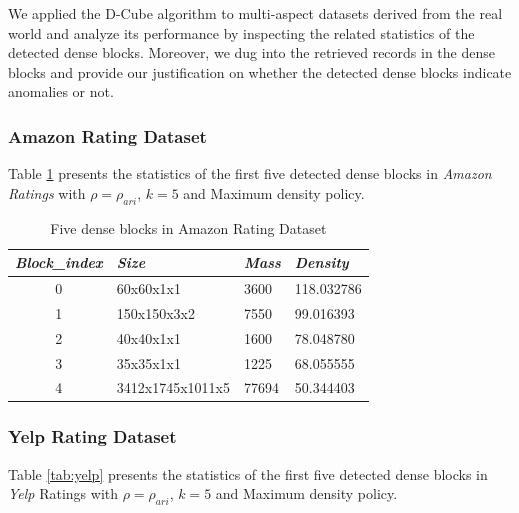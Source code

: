 We applied the D-Cube algorithm to multi-aspect datasets derived from the real world and analyze its performance by inspecting the related statistics of the detected dense blocks. Moreover, we dug into the retrieved records in the dense blocks and provide our justification on whether the detected dense blocks indicate anomalies or not. 

\subsubsection{Amazon Rating Dataset}

Table \ref{tab:amazon} presents the statistics of the first five detected dense blocks in \textit{Amazon Ratings} with $\rho=\rho_{ari}$, $k=5$ and Maximum density policy.  

\renewcommand{\arraystretch}{1.5}
\begin{table}[h!t]
\centering
\caption{Five dense blocks in Amazon Rating Dataset}
\label{tab:amazon}
\begin{tabular}{|c|p{4cm}|p{2cm}|p{3cm}|}
\hline
\textit{\textbf{Block\_index}} & \textit{\textbf{Size}} & \textit{\textbf{Mass}} & \textit{\textbf{Density}} \\ \hline
{0}                     & 60x60x1x1                 & 3600                               & 118.032786                           \\ \hline
{1}                     & 150x150x3x2                 & 7550                               & 99.016393                          \\ \hline
{2}                     & 40x40x1x1                 & 1600                               & 78.048780                           \\ \hline
{3}                     & 35x35x1x1                  & 1225                                & 68.055555                           \\ \hline
{4}                     & 3412x1745x1011x5                 & 77694                                & 50.344403                           \\ \hline
\end{tabular}
\end{table}

\subsubsection{Yelp Rating Dataset}

Table \ref{tab:yelp} presents the statistics of the first five detected dense blocks in \textit{Yelp} Ratings with $\rho=\rho_{ari}$, $k=5$ and Maximum density policy.  


